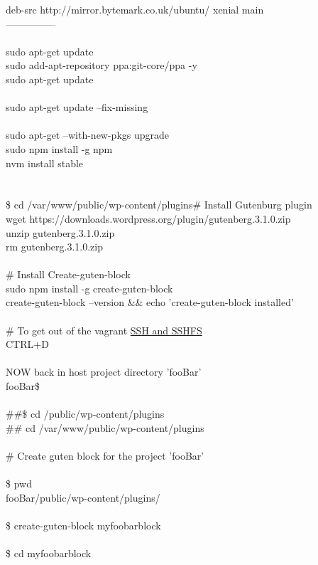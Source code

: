 \documentclass[10pt,a4paper]{article}
\begin{document}
{{{{{{{{{{{{{{{{{{{{{{{{	deb-src http://mirror.bytemark.co.uk/ubuntu/ xenial main \\
---------------\\
\\
sudo apt-get update\\
sudo add-apt-repository ppa:git-core/ppa -y\\
sudo apt-get update\\
\\
sudo apt-get update --fix-missing\\
\\
sudo apt-get --with-new-pkgs upgrade\\
sudo npm install -g npm\\
nvm install stable\\
\\
\\
\$ cd /var/www/public/wp-content/plugins\# Install Gutenburg plugin \\
wget https://downloads.wordpress.org/plugin/gutenberg.3.1.0.zip\\
unzip gutenberg.3.1.0.zip\\
rm gutenberg.3.1.0.zip\\
\\
\# Install Create-guten-block\\
sudo npm install -g create-guten-block\\
create-guten-block --version \&\& echo 'create-guten-block installed'\\
\\
\# To get out of the vagrant \hyperlink{ssh___and_sshfs}{SSH   and SSHFS}\\
CTRL+D\\
\\
NOW back in host project directory 'fooBar'\\
fooBar\$ \\
\\
\#\#\$ cd /public/wp-content/plugins\\
\#\# cd /var/www/public/wp-content/plugins\\
\\
\# Create guten block for the project 'fooBar'\\
\\
\$ pwd\\
fooBar/public/wp-content/plugins/\\
\\
\$ create-guten-block myfoobarblock\\
\\
\$ cd myfoobarblock\\
}}}}}}}}}}}}}}}}}}}}}}}}
\end{document}
